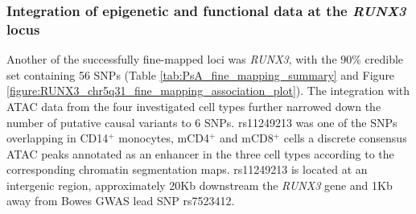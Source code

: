 \subsubsection{Integration of epigenetic and functional data at the \textit{RUNX3} locus}
Another of the successfully fine-mapped loci was \textit{RUNX3}, with the 90\% credible set containing 56 SNPs (Table \ref{tab:PsA_fine_mapping_summary} and Figure \ref{figure:RUNX3_chr5q31_fine_mapping_association_plot}). The integration with ATAC data from the four investigated cell types further narrowed down the number of putative causal variants to 6 SNPs. rs11249213 was one of the SNPs overlapping in CD14$^+$ monocytes, mCD4$^+$ and mCD8$^+$ cells a discrete consensus ATAC peaks annotated as an enhancer in the three cell types according to the corresponding chromatin segmentation maps. rs11249213 is located at an intergenic region, approximately 20Kb downstream the \textit{RUNX3} gene and 1Kb away from Bowes GWAS lead SNP rs7523412.  



